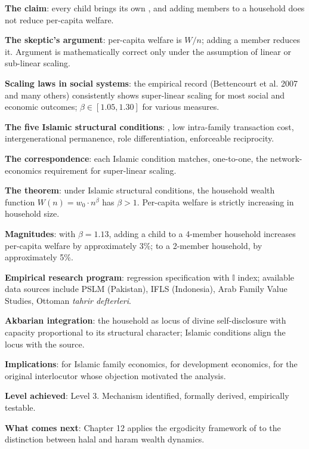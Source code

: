 \begin{summarybox}
\textbf{The claim}: every child brings its own , and
adding members to a household does not reduce per-capita welfare.

\textbf{The skeptic's argument}: per-capita welfare is $W/n$;
adding a member reduces it. Argument is mathematically correct only
under the assumption of linear or sub-linear scaling.

\textbf{Scaling laws in social systems}: the empirical record
(Bettencourt et al. 2007 and many others) consistently shows
super-linear scaling for most social and economic outcomes;
$\beta \in [1.05, 1.30]$ for various measures.

\textbf{The five Islamic structural conditions}: ,
low intra-family transaction cost, intergenerational permanence,
 role differentiation, enforceable reciprocity.

\textbf{The correspondence}: each Islamic condition matches, one-to-one,
the network-economics requirement for super-linear scaling.

\textbf{The theorem}: under Islamic structural conditions, the
household wealth function $W(n) = w_0 \cdot n^\beta$ has $\beta > 1$.
Per-capita welfare is strictly increasing in household size.

\textbf{Magnitudes}: with $\beta = 1.13$, adding a child to a
4-member household increases per-capita welfare by approximately
3\%; to a 2-member household, by approximately 5\%.

\textbf{Empirical research program}: regression specification with
$\mathbb{I}$ index; available data sources include PSLM (Pakistan),
IFLS (Indonesia), Arab Family Value Studies, Ottoman \textit{tahrir
defterleri}.

\textbf{Akbarian integration}: the household as locus of divine
self-disclosure with capacity proportional to its structural
character; Islamic conditions align the locus with the source.

\textbf{Implications}: for Islamic family economics, for development
economics, for the original interlocutor whose objection
motivated the analysis.

\textbf{Level achieved}: Level 3. Mechanism identified, formally
derived, empirically testable.

\textbf{What comes next}: Chapter 12 applies the ergodicity framework
of  to the distinction between halal and haram
wealth dynamics.
\end{summarybox}

\cleardoublepage
